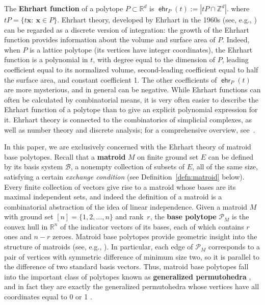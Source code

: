 \documentclass[11pt]{amsart}
\theoremstyle{definition}
\newcommand{\0}{\emptyset}
\newcommand{\R}{\mathbb{R}}
\newcommand{\Z}{\mathbb{Z}}
\newcommand{\bx}{\mathbf{x}}
\newcommand{\B}{\mathcal{B}}
\newcommand{\Po}{\mathcal{P}}
\DeclareMathOperator{\ehr}{\mathsf{ehr}}
\newcommand{\defterm}[1]{\textbf{#1}}
\begin{document}
The \defterm{Ehrhart function} of a polytope $P\subset \R^d$ is $\ehr_P(t):=|tP\cap \Z^d|$. where $tP=\{t\bx:\ \bx\in P\}$.  Ehrhart theory, developed by Ehrhart in the 1960s (see, e.g., \cite{Ehrhart}) can be regarded as a discrete version of integration: the growth of the Ehrhart function provides information about the volume and surface area of $P$.  Indeed, when $P$ is a lattice polytope (its vertices have integer coordinates), the Ehrhart function is a polynomial in $t$, with degree equal to the dimension of $P$, leading coefficient equal to its normalized volume, second-leading coefficient equal to half the surface area, and constant coefficient 1.
The other coefficients of $\ehr_P(t)$ are more mysterious, and in general can be negative.  While Ehrhart functions can often be calculated by combinatorial means, it is very often easier to describe the Ehrhart function of a polytope than to give an explicit polynomial expression for it.
Ehrhart theory is connected to the combinatorics of simplicial complexes, as well as number theory and discrete analysis; for a comprehensive overview, see~\cite{BeckRobins}.

In this paper, we are exclusively concerned with the Ehrhart theory of matroid base polytopes.  Recall that a \defterm{matroid} $M$ on finite ground set $E$ can be defined by its basis system $\B$, a nonempty collection of subsets of $E$, all of the same size, satisfying a certain \textit{exchange condition} (see Definition~\ref{defn:matroid} below).  Every finite collection of vectors give rise to a matroid whose bases are its maximal independent sets, and indeed the definition of a matroid is a combinatorial abstraction of the idea of linear independence.  Given a matroid $M$ with ground set $[n]=\{1,2,\dots,n\}$ and rank~$r$, the \defterm{base polytope} $\Po_M$ is the convex hull in $\R^n$ of the indicator vectors of its bases, each of which contains $r$ ones and $n-r$ zeroes.
Matroid base polytopes provide geometric insight into the structure of matroids (see, e.g., \cite{FeichtnerSturmfels}).  In particular, each edge of $\Po_M$ corresponds to a pair of vertices with symmetric difference of minimum size two, so it is parallel to the difference of two standard basis vectors.  Thus, matroid base polytopes fall into the important class of polytopes known as \defterm{generalized permutohedra} \cite{Beyond,PRW}, and in fact they
are exactly the generalized permutohedra whose vertices have all coordinates equal to 0 or 1 \cite{GGMS}.
 
\end{document}
